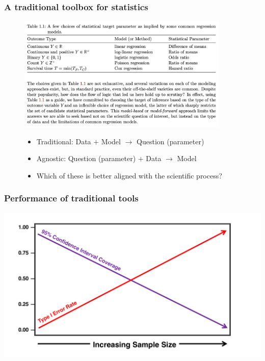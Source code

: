 \documentclass[t]{beamer}
\begin{document}
\begin{frame}
\frametitle{A traditional toolbox for statistics}
\vspace{-12pt}
\centering
\begin{figure}
\includegraphics[width=0.9\textwidth]{figures/parametric.png}
\vspace{1em}
\begin{itemize}
  \item Traditional: Data $+$ Model $\rightarrow$ Question (parameter)
  \item Agnostic: Question (parameter) $+$ Data $\rightarrow$ Model
  \item Which of these is better aligned with the scientific process?
\end{itemize}
\end{figure}

\end{frame}
\begin{frame}
\frametitle{Performance of traditional tools}
\vspace{5pt}
\centering
\includegraphics[width=1.05\textwidth]{figures/misspecified.pdf}
\end{frame}
\end{document}
